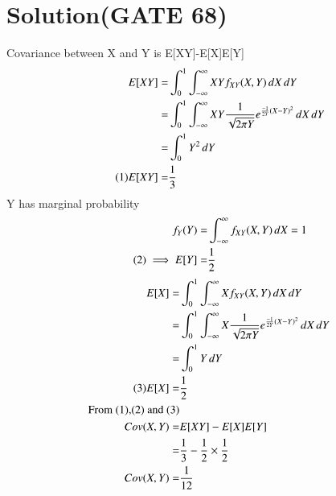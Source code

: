 \documentclass[journal,12pt,twocolumn]{IEEEtran}
\begin{document}
\section*{\textbf{Solution(GATE 68)}}
Covariance between X and Y is E[XY]-E[X]E[Y]\\
\begin{align*}
    E[ XY ]=&\int_{0}^{1}\int_{-\infty}^{\infty}XY f_{XY}(X,Y)\,dX\,dY\\
    =&\int_{0}^{1}\int_{-\infty}^{\infty}XY\frac{1}{\sqrt{2\pi Y}}e^{\frac{-1}{2Y}(X-Y)^2}\,dX \,dY\\
    =&\int_{0}^{1}Y^2 \,dY\\
    \tag{1}
    E[ XY ]=&\frac{1}{3}
\end{align*}
Y has marginal probability
\begin{align*}
    f_Y(Y)=&\int_{-\infty}^{\infty}f_{XY}(X,Y)\,dX =1\\
    \tag{2}
    \implies E[ Y ]=&\frac{1}{2}
\end{align*}
\begin{align*}
 E[ X ]=&\int_{0}^{1}\int_{-\infty}^{\infty}X f_{XY}(X,Y)\,dX\,dY\\
    =&\int_{0}^{1}\int_{-\infty}^{\infty}X\frac{1}{\sqrt{2\pi Y}}e^{\frac{-1}{2Y}(X-Y)^2}\,dX \,dY\\
    =&\int_{0}^{1}Y\,dY\\
    \tag{3}
E[ X ]=&\frac{1}{2}\\
\text{From (1),(2) and (3)}\\
Cov(X,Y)=&E[ XY ]-E[ X ]E[ Y ]\\
       =&\frac{1}{3}-\frac{1}{2}\times \frac{1}{2}\\
Cov(X,Y)=&\frac{1}{12}
\end{align*}
\end{document}
